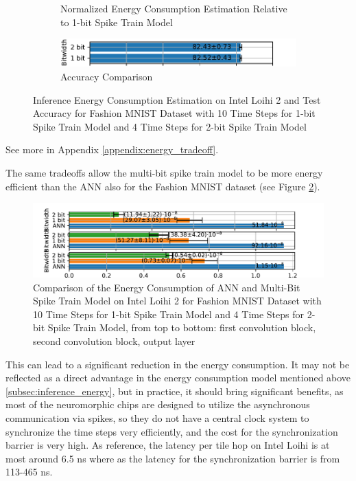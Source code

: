 \begin{figure}[!htpb]
\begin{subfigure}[H]{0.48\textwidth}
                \caption{Normalized Energy Consumption Estimation Relative to 1-bit Spike Train Model}
            \end{subfigure}
            \hfill
            \begin{subfigure}[H]{\textwidth}
                \centering
                \includegraphics[width=\textwidth]{../timesteps/FashionMNIST/plots/fashionmnist_final_acc.pdf}
                \caption{Accuracy Comparison}
            \end{subfigure}
            \caption{Inference Energy Consumption Estimation on Intel Loihi 2 and Test Accuracy for Fashion MNIST Dataset with 10 Time Steps for 1-bit Spike Train Model and 4 Time Steps for 2-bit Spike Train Model}
            \label{fig:inference_energy_nh_timesteps}
        \end{figure}
        
        See more in Appendix \ref{appendix:energy_tradeoff}.

        The same tradeoffs allow the multi-bit spike train model to be more energy efficient than the ANN also for the Fashion MNIST dataset (see Figure \ref{fig:energy_ann_vs_snn_timesteps}).
        \begin{figure}[H]
            \centering
            \includegraphics[width=\textwidth]{../timesteps/FashionMNIST/plots/fashionmnist_energy_ann_vs_snn.pdf}
            \caption{Comparison of the Energy Consumption of ANN and Multi-Bit Spike Train Model on Intel Loihi 2 for Fashion MNIST Dataset with 10 Time Steps for 1-bit Spike Train Model and 4 Time Steps for 2-bit Spike Train Model, from top to bottom: first convolution block, second convolution block, output layer}
            \label{fig:energy_ann_vs_snn_timesteps}
        \end{figure}

        This can lead to a significant reduction in the energy consumption. It may not be reflected as a direct advantage in the energy consumption model mentioned above \ref{subsec:inference_energy}, but in practice, it should bring significant benefits, as most of the neuromorphic chips are designed to utilize the asynchronous communication via spikes, so they do not have a central clock system to synchronize the time steps very efficiently, and the cost for the synchronization barrier is very high. As reference, the latency per tile hop on Intel Loihi is at most around 6.5 ns where as the latency for the synchronization barrier is from 113-465 ns. 

